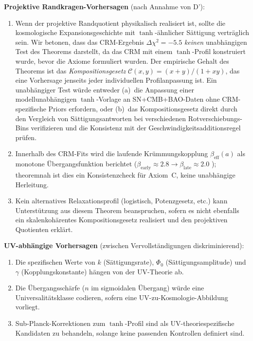 \documentclass[aps,prd,twocolumn,superscriptaddress,nofootinbib]{revtex4-2}
\begin{document}
\textbf{Projektive Randkragen-Vorhersagen} (nach Annahme von D'):
\begin{enumerate}
\item Wenn der projektive Randquotient physikalisch realisiert ist, sollte die kosmologische Expansionsgeschichte mit $\tanh$-ähnlicher Sättigung verträglich sein. Wir betonen, dass das CRM-Ergebnis $\Delta\chi^2 = -5.5$ \cite{Geiger2026b} \textit{keinen} unabhängigen Test des Theorems darstellt, da das CRM mit einem $\tanh$-Profil konstruiert wurde, bevor die Axiome formuliert wurden. Der empirische Gehalt des Theorems ist das \textit{Kompositionsgesetz} $\mathcal{C}(x,y) = (x+y)/(1+xy)$, das eine Vorhersage jenseits jeder individuellen Profilanpassung ist. Ein unabhängiger Test würde entweder (a)~die Anpassung einer modellunabhängigen $\tanh$-Vorlage an SN+CMB+BAO-Daten ohne CRM-spezifische Priors erfordern, oder (b)~das Kompositionsgesetz direkt durch den Vergleich von Sättigungsantworten bei verschiedenen Rotverschiebungs-Bins verifizieren und die Konsistenz mit der Geschwindigkeitsadditionsregel prüfen.
\item Innerhalb des CRM-Fits wird die laufende Krümmungskopplung $\beta_{\mathrm{eff}}(a)$ als monotone Übergangsfunktion berichtet ($\beta_{\mathrm{early}} \approx 2.8 \to \beta_{\mathrm{late}} \approx 2.0$ \cite{Geiger2026b}); theoremnah ist dies ein Konsistenzcheck für Axiom~C, keine unabhängige Herleitung.
\item Kein alternatives Relaxationsprofil (logistisch, Potenzgesetz, etc.) kann Unterstützung aus diesem Theorem beanspruchen, sofern es nicht ebenfalls ein skalenkohärentes Kompositionsgesetz realisiert und den projektiven Quotienten erklärt.
\end{enumerate}

\textbf{UV-abhängige Vorhersagen} (zwischen Vervollständigungen diskriminierend):
\begin{enumerate}
\item Die spezifischen Werte von $k$ (Sättigungsrate), $\Phi_0$ (Sättigungsamplitude) und $\gamma$ (Kopplungskonstante) hängen von der UV-Theorie ab.
\item Die Übergangsschärfe ($n$ im sigmoidalen Übergang) würde eine Universalitätsklasse codieren, sofern eine UV-zu-Kosmologie-Abbildung vorliegt.
\item Sub-Planck-Korrektionen zum $\tanh$-Profil sind als UV-theoriespezifische Kandidaten zu behandeln, solange keine passenden Kontrollen definiert sind.
\end{enumerate}
\end{document}
